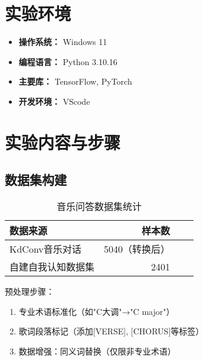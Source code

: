 \documentclass[a4paper,11pt]{article}
\begin{document}
\section{实验环境}
\begin{itemize}
    \item \textbf{操作系统：} Windows 11 
    \item \textbf{编程语言：} Python 3.10.16
    \item \textbf{主要库：} TensorFlow, PyTorch
    \item \textbf{开发环境：} VScode
\end{itemize}

\section{实验内容与步骤}
\subsection{数据集构建}
\begin{table}[h]
    \centering
    \caption{音乐问答数据集统计}
    \begin{tabular}{lrrr}
        \toprule
        数据来源 & 样本数  \\
        \midrule
        KdConv音乐对话 & 5040（转换后） \\
        自建自我认知数据集 & 2401  \\
        \bottomrule
    \end{tabular}
\end{table}

预处理步骤：
\begin{enumerate}
    \item 专业术语标准化（如"C大调"→"C major"）
    \item 歌词段落标记（添加[VERSE], [CHORUS]等标签）
    \item 数据增强：同义词替换（仅限非专业术语）
\end{enumerate}
\end{document}
